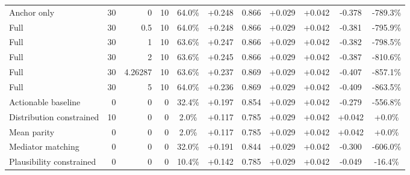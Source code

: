 \begin{table}[htbp]
\begin{tabular}{lrrrccccccc}
Anchor only & 30 & 0 & 10 & 64.0\% & +0.248 & 0.866 & +0.029 & +0.042 & -0.378 & -789.3\% \\
Full & 30 & 0.5 & 10 & 64.0\% & +0.248 & 0.866 & +0.029 & +0.042 & -0.381 & -795.9\% \\
Full & 30 & 1 & 10 & 63.6\% & +0.247 & 0.866 & +0.029 & +0.042 & -0.382 & -798.5\% \\
Full & 30 & 2 & 10 & 63.6\% & +0.245 & 0.866 & +0.029 & +0.042 & -0.387 & -810.6\% \\
Full & 30 & 4.26287 & 10 & 63.6\% & +0.237 & 0.869 & +0.029 & +0.042 & -0.407 & -857.1\% \\
Full & 30 & 5 & 10 & 64.0\% & +0.236 & 0.869 & +0.029 & +0.042 & -0.409 & -863.5\% \\
Actionable baseline & 0 & 0 & 0 & 32.4\% & +0.197 & 0.854 & +0.029 & +0.042 & -0.279 & -556.8\% \\
Distribution constrained & 10 & 0 & 0 & 2.0\% & +0.117 & 0.785 & +0.029 & +0.042 & +0.042 & +0.0\% \\
Mean parity & 0 & 0 & 0 & 2.0\% & +0.117 & 0.785 & +0.029 & +0.042 & +0.042 & +0.0\% \\
Mediator matching & 0 & 0 & 0 & 32.0\% & +0.191 & 0.844 & +0.029 & +0.042 & -0.300 & -606.0\% \\
Plausibility constrained & 0 & 0 & 0 & 10.4\% & +0.142 & 0.785 & +0.029 & +0.042 & -0.049 & -16.4\% \\
\bottomrule
\end{tabular}
\end{table}